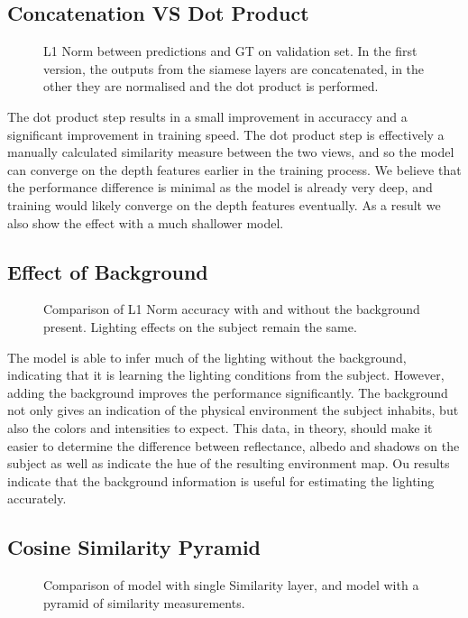 \documentclass[ %
                    author={Gavin Parker},
                supervisor={Dr. Neill Campbell},
                    degree={MEng},
                     title={Deep Siamese Networks for Illumination Estimation from Stereo Images},
                  subtitle={},
                      type={research},
                      year={2018} ]{dissertation}
\begin{document}
\subsection{Concatenation VS Dot Product}
\begin{figure}[H]
\setlength\figureheight{6cm}
\setlength\figurewidth{12cm}
\centering

\caption{L1 Norm between predictions and GT on validation set. In the first version, the outputs from the siamese layers are concatenated, in the other they are normalised and the dot product is performed.}
\end{figure}
The dot product step results in a small improvement in accuraccy and a significant improvement in training speed. The dot product step is effectively a manually calculated similarity measure between the two views, and so the model can converge on the depth features earlier in the training process. We believe that the performance difference is minimal as the model is already very deep, and training would likely converge on the depth features eventually. As a result we also show the effect with a much shallower model. 

\subsection{Effect of Background}
\begin{figure}[H]
\setlength\figureheight{6cm}
\setlength\figurewidth{12cm}
\centering

\caption{Comparison of L1 Norm accuracy with and without the background present. Lighting effects on the subject remain the same.}
\end{figure}
The model is able to infer much of the lighting without the background, indicating that it is learning the lighting conditions from the subject. However, adding the background improves the performance significantly. The background not only gives an indication of the physical environment the subject inhabits, but also the colors and intensities to expect. This data, in theory, should make it easier to determine the difference between reflectance, albedo and shadows on the subject as well as indicate the hue of the resulting environment map. Ou results indicate that the background information is useful for estimating the lighting accurately.
\subsection{Cosine Similarity Pyramid}
\begin{figure}[H]
\setlength\figureheight{6cm}
\setlength\figurewidth{12cm}
\centering

\caption{Comparison of model with single Similarity layer, and model with a pyramid of similarity measurements.}
\end{figure}
\end{document}
